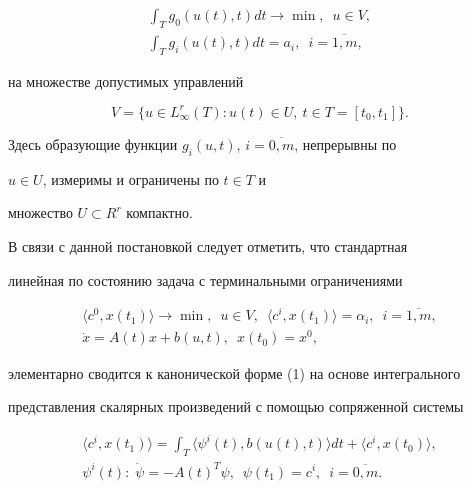 \begin{equation}


\begin{array}{c}


\displaystyle \int_{T}g_{0}(u(t),t)dt\rightarrow\min,\ \;u\in V, \\[3mm]


%


\displaystyle \int_{T}g_{i}(u(t),t)dt=a_{i},\ \;i=\overline{1,m},


\end{array}


\end{equation}


на множестве допустимых управлений


$$


V=\{u\in L_{\infty}^{r}(T):u(t)\in U,\ t\in T=[t_{0},t_{1}]\}.


$$


Здесь образующие функции $g_{i}(u,t)$, $i=\overline{0,m}$, непрерывны по


$u\in U$, измеримы и ограничены по $t\in T$ и 


множество $U\subset R^{r}$ компактно.





В связи с данной постановкой следует отметить, что стандартная 


линейная по состоянию задача с терминальными ограничениями


\begin{gather*}


\langle c^{0},x(t_{1})\rangle\rightarrow\min,


\ \;u\in V,\ \;\langle c^{i},x(t_{1})\rangle=\alpha_{i},


\ \;i=\overline{1,m}, \\


%


\Dot{x}=A(t)x+b(u,t),\ \;x(t_{0})=x^{0},


\end{gather*}


элементарно сводится к канонической форме (1) на основе интегрального


представления скалярных произведений с помощью сопряженной системы


\begin{gather*}


\langle c^{i},x(t_{1})\rangle=


\int_T\langle\psi^{i}(t),b(u(t),t)\rangle dt+\langle c^{i},x(t_{0})\rangle,\\


%


\psi^{i}(t):\;\Dot{\psi}=-A(t)^{T}\psi,


\ \;\psi(t_{1})=c^{i},\ \;i=\overline{0,m}.


\end{gather*}





